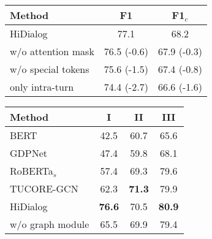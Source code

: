 \begin{minipage}[]{0.48\linewidth}
\footnotesize
\setlength{\tabcolsep}{7pt}
\begin{center}
\begin{tabular}{l c c} 
 \toprule
  {\textbf{Method}} & \textbf{F1} & \textbf{F1$_c$} \\
 \midrule
HiDialog                      & 77.1        & 68.2       \\ 
w/o attention mask & 76.5 (-0.6) & 67.9 (-0.3) \\
w/o special tokens & 75.6 (-1.5) & 67.4 (-0.8) \\
only intra-turn     & 74.4 (-2.7) & 66.6 (-1.6) \\
\bottomrule
\end{tabular}
\end{center}
\label{tab:ablation_structure}
\end{minipage}
\hspace*{0.1cm}
\begin{minipage}[]{0.48\linewidth}
\footnotesize
\setlength{\tabcolsep}{7pt}
\begin{center}
\begin{tabular}{lccc} 
\toprule
\textbf{Method} & \textbf{I} &  \textbf{II} &  \textbf{III}\\
\midrule
BERT & 42.5  & 60.7 & 65.6 \\
GDPNet  & 47.4  &59.8  &68.1 \\
RoBERTa$_s$ & 57.4 & 69.3 & 79.6 \\
TUCORE-GCN  &62.3  &\textbf{71.3}  &79.9 \\
\midrule
HiDialog & \textbf{76.6}  & 70.5	& \textbf{80.9}  \\
w/o graph module &65.5 & 69.9 & 79.4\\
\bottomrule
\end{tabular}
\end{center}
\label{tab:symmetric}
\vspace{0.5cm}
\end{minipage}

